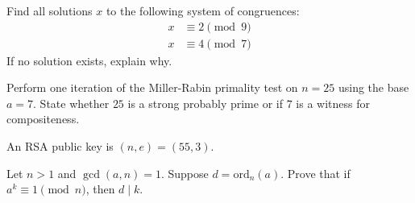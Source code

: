 \documentclass[12pt]{exam}
\begin{document}
\begin{questions}

\addpoints

\newpage
\question[10] %

\newpage
\question[10] %

\newpage
\question[5] %
Find all solutions $x$ to the following system of congruences:
\begin{align*}
    x &\equiv 2 \pmod{9} \\
    x &\equiv 4 \pmod{7}
\end{align*}
If no solution exists, explain why.

\vfill

\newpage
\question[5] %
Perform one iteration of the Miller-Rabin primality test on $n = 25$ using the base $a = 7$. State whether $25$ is a strong probably prime or if $7$ is a witness for compositeness.

\vfill

\newpage
\question[10] %
An RSA public key is $(n, e) = (55, 3)$. 

\newpage
\question[10] %
Let $n > 1$ and $\gcd(a, n) = 1$. Suppose $d = \text{ord}_n(a)$. Prove that if $a^k \equiv 1 \pmod{n}$, then $d \mid k$. 

\vfill

\end{questions}
\end{document}

